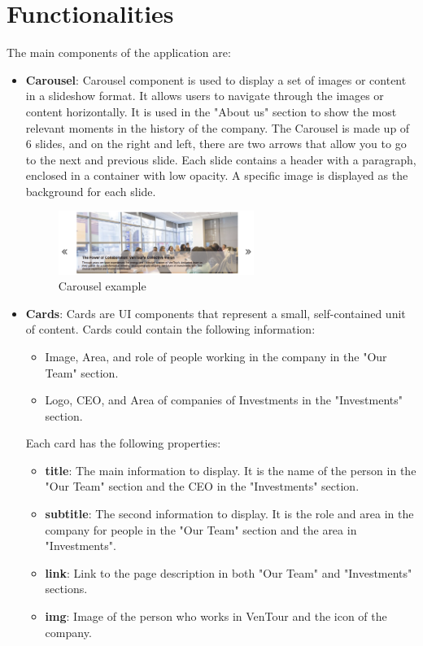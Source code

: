 \documentclass[12pt]{article}
\begin{document}
\section{Functionalities}
The main components of the application are:
\begin{itemize}
  \item \textbf{Carousel}: Carousel component is used to display a set of images or content in a slideshow format. It allows users to navigate through the images or content horizontally. It is used in the "About us" section to show the most relevant moments in the history of the company. The Carousel is made up of 6 slides, and on the right and left, there are two arrows that allow you to go to the next and previous slide. Each slide contains a header with a paragraph, enclosed in a container with low opacity. A specific image is displayed as the background for each slide.
  
  \begin{figure}[h]
    \centering
    \includegraphics[width=0.6\textwidth]{Images/Carousel.png}
    \caption{Carousel example}
  \end{figure}
  
  \item \textbf{Cards}: Cards are UI components that represent a small, self-contained unit of content. Cards could contain the following information:
    \begin{itemize}
      \item Image, Area, and role of people working in the company in the "Our Team" section.
      \item Logo, CEO, and Area of companies of Investments in the "Investments" section.
    \end{itemize}
    Each card has the following properties:
    \begin{itemize}
      \item \textbf{title}: The main information to display. It is the name of the person in the "Our Team" section and the CEO in the "Investments" section.
      \item \textbf{subtitle}: The second information to display. It is the role and area in the company for people in the "Our Team" section and the area in "Investments".
      \item \textbf{link}: Link to the page description in both "Our Team" and "Investments" sections.
      \item \textbf{img}: Image of the person who works in VenTour and the icon of the company.
    \end{itemize}
  

\end{itemize}
\end{document}

